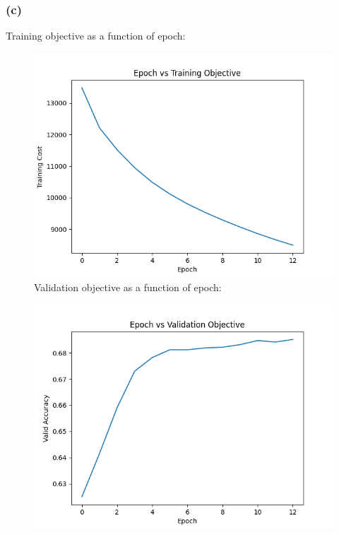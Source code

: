 \documentclass{article}
\begin{document}
\subsubsection{(c)}
Training objective as a function of epoch:\\
\begin{figure}[H]
\centering
\includegraphics[scale=0.6]{figures/Aq3_train_objective_plot.png}\\
Validation objective as a function of epoch:\\
\end{figure}
\begin{figure}[H]
\centering
\includegraphics[scale=0.6]{figures/Aq3_valid_objective_plot.png}\\
\end{figure}
\end{document}
